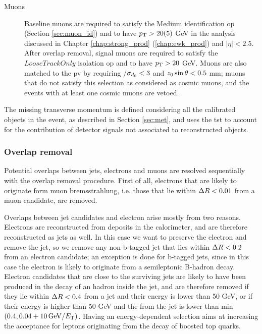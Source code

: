 \begin{description}
\item[Muons] Baseline muons are required to satisfy the Medium identification \gls{op} (Section \ref{sec:muon_id}) and to have $p_{\rm T} > 20 (5)$ GeV in the analysis discussed in Chapter \ref{chap:strong_prod} (\ref{chap:ewk_prod}) and $|\eta|<2.5$. 
After overlap removal, signal muons are required to satisfy the $LooseTrackOnly$ isolation \gls{op} and to have $p_{\rm T} > 20$ GeV.
Muons are also matched to the \gls{pv} by requiring \dzero/$\sigma_{d_0} < 3$ and  ${z_0} \sin\theta < 0.5$ mm; muons that do not satisfy this selection as considered as cosmic muons, and the events with at least one cosmic muons are vetoed.

\end{description}

The missing transverse momentum is defined considering all the calibrated objects in the event, as described in Section \ref{sec:met}, and uses the \gls{tst} to account for the contribution of
detector signals not associated to reconstructed objects. 

\subsubsection*{Overlap removal}

Potential overlaps between jets, electrons and muons are resolved sequentially with the overlap removal procedure. 
First of all, electrons that are likely to originate form muon bremsstrahlung, i.e. those that lie within $\Delta R < 0.01$ from a muon candidate, are removed.

Overlaps between jet candidates and electron arise mostly from two reasons. Electrons are reconstructed from deposits in the calorimeter, and are therefore reconstructed as jets as well.
In this case we want to preserve the electron and remove the jet, so we remove any non-b-tagged jet that lies within $\Delta R < 0.2$ from an electron candidate;
an exception is done for b-tagged jets, since in this case the electron is likely to originate from a semileptonic B-hadron decay. 
Electron candidates that are close to the surviving jets are likely to have been produced in the decay of an hadron inside the jet, and are therefore removed
if they lie within $\Delta R<0.4$ from a jet and their energy is lower than 50 GeV, or if their energy is higher than 50 GeV and the \dR from the jet 
is lower than min$(0.4, 0.04 + 10 \, {\rm{GeV}}/E_{\rm{T}})$. 
Having an energy-dependent \dR selection aims at increasing the acceptance for leptons originating from the decay of boosted top quarks.

